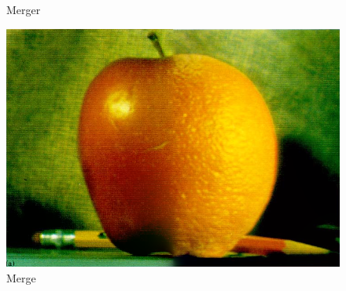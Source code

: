 \documentclass{article}
\begin{document}
    \begin{figure}[!htb]
      \caption{Merger}
    \endminipage \hfill
      \includegraphics[scale=.3]{./blending/ao/final_1.png}
      \caption{Merge}
    \endminipage \hfill
    \end{figure}
    
    \phantom{}\\
    \pagebreak
    
\end{document}
